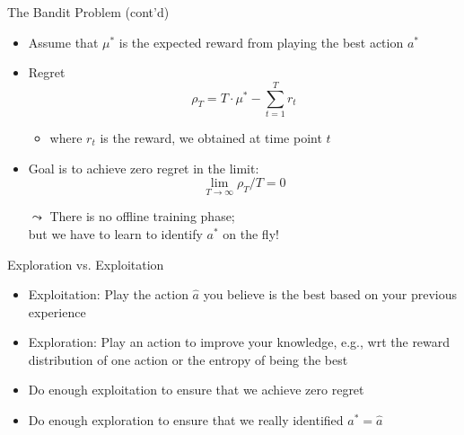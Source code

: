 \begin{frame}[c]{The Bandit Problem (cont'd)}
	
	\begin{itemize}
		\item Assume that $\mu^*$ is the expected reward from playing the best action $a^*$
		\item Regret
		$$\rho_T = T \cdot \mu^* - \sum^T_{t=1} r_t $$
		\begin{itemize}
			\item where $r_t$ is the reward, we obtained at time point $t$
		\end{itemize}
	\medskip
		\item Goal is to achieve zero regret in the limit:
		$$\lim_{T \to \infty} \rho_T / T = 0$$	
		\item[$\leadsto$] There is no offline training phase;\\ but we have to learn to identify $a^*$ on the fly!
	\end{itemize}
	
\end{frame}
\begin{frame}[c]{Exploration vs. Exploitation}
	
	\begin{itemize}
		\item \alert{Exploitation}: Play the action $\hat{a}$ you believe is the best based on your previous experience
		\medskip
		\item \alert{Exploration}: Play an action to improve your knowledge, e.g., wrt the reward distribution of one action or the entropy of being the best
		\medskip
		\pause
		\item Do enough exploitation to ensure that we achieve zero regret
		\item Do enough exploration to ensure that we really identified $a^* = \hat{a}$
	\end{itemize}
	
\end{frame}

